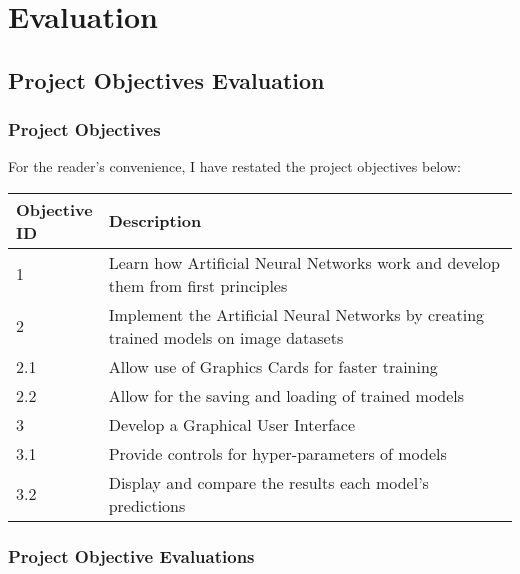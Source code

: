 \documentclass[./project-report/src/latex/project-report.tex]{subfiles}
\begin{document}
\maketitle

\section{Evaluation}

\subsection{Project Objectives Evaluation}

\subsubsection{Project Objectives}

For the reader's convenience, I have restated the project objectives below:
\vspace{5mm}

\noindent\begin{tabular}{|p{0.13\linewidth}|p{0.87\linewidth}|}
    \hline
    \textbf{Objective ID} & \textbf{Description} \\
    \hline
    1 & Learn how Artificial Neural Networks work and develop them from first principles \\
    \hline
    2 & Implement the Artificial Neural Networks by creating trained models on image datasets \\
    \hline
    2.1 & Allow use of Graphics Cards for faster training \\
    \hline
    2.2 & Allow for the saving and loading of trained models \\
    \hline
    3 & Develop a Graphical User Interface \\
    \hline
    3.1 & Provide controls for hyper-parameters of models \\
    \hline
    3.2 & Display and compare the results each model's predictions \\
    \hline
\end{tabular}

\subsubsection{Project Objective Evaluations}
\end{document}
